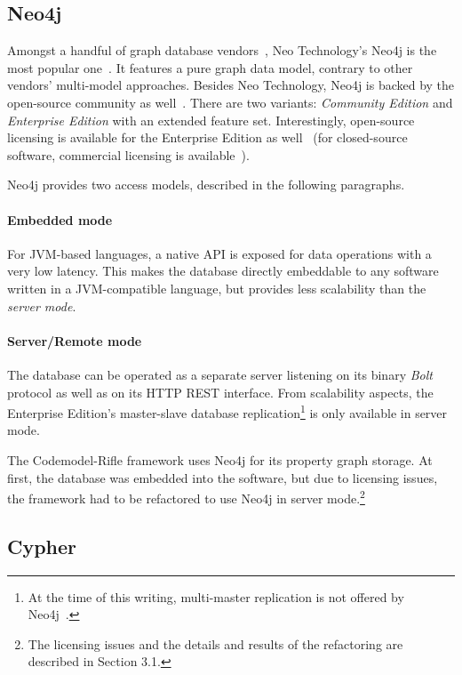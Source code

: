 \subsection{Neo4j}

Amongst a handful of graph database vendors~\cite{graph-dbs}, Neo Technology's Neo4j is the most popular one~\cite{graph-dbs-raking}. It features a pure graph data model, contrary to other vendors' multi-model approaches. Besides Neo Technology, Neo4j is backed by the open-source community as well~\cite{neo4j-github}. There are two variants: \emph{Community Edition} and \emph{Enterprise Edition} with an extended feature set. Interestingly, open-source licensing is available for the Enterprise Edition as well~\cite{neo4j-opensource} (for closed-source software, commercial licensing is available~\cite{neo4j-licensing}).

Neo4j provides two access models, described in the following paragraphs.

\paragraph{Embedded mode} For JVM-based languages, a native API is exposed for data operations with a very low latency. This makes the database directly embeddable to any software written in a JVM-compatible language, but provides less scalability than the \emph{server mode}.

\paragraph{Server/Remote mode} The database can be operated as a separate server listening on its binary \emph{Bolt} protocol as well as on its HTTP REST interface. From scalability aspects, the Enterprise Edition's master-slave database replication\footnote{At the time of this writing, multi-master replication is not offered by Neo4j~\cite{neo4j-clustering-architecture}.} is only available in server mode.

The Codemodel-Rifle framework uses Neo4j for its property graph storage. At first, the database was embedded into the software, but due to licensing issues, the framework had to be refactored to use Neo4j in server mode.\footnote{The licensing issues and the details and results of the refactoring are described in Section 3.1.}

\subsection{Cypher}

